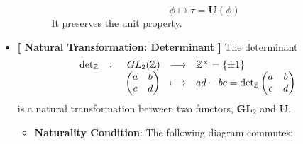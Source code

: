 \begin{example}
\begin{itemize}
\begin{enumerate}
\begin{itemize}
\[			\phi\mapsto\tau=\mathbf{U}(\phi)
			\] It preserves the unit property.
		\end{itemize}
	\end{enumerate}
	\item \textbf{[ Natural Transformation: Determinant ]} The determinant \[
	\fullfunction{\det_\Z}{GL_2(\Z)}{\Z^{\times}=\set{\pm 1}}{\begin{pmatrix}
			a & b\\ c & d
	\end{pmatrix}}{ad-bc=\det_\Z\begin{pmatrix}
	a & b\\ c & d
\end{pmatrix}}
	\] is a natural transformation between two functors, $\mathbf{GL}_2$ and $\mathbf{U}$.
	\begin{itemize}
		\item \textbf{Naturality Condition}: The following diagram commutes:
		\begin{center}
		\end{center}
	\end{itemize}
\end{itemize}
\begin{figure}[h!]\centering
\end{figure}
\end{example}

